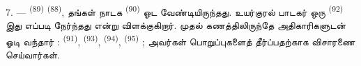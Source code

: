 7. ---  \textsuperscript{(89)}
 \textsuperscript{(88)}, 
 தங்கள் நாடக 
\textsuperscript{(90)} ஓட வேண்டியிருந்தது. உயர்குரல் பாடகர் ஒரு
 \textsuperscript{(92)} இது எப்படி நேர்ந்தது
என்று விளக்குகிறார்.  முதல் கணத்திலிருந்தே
அதிகாரிகளுடன் ஓடி வந்தார் :  \textsuperscript{(91)},
 \textsuperscript{(93)}, 
\textsuperscript{(94)}, 
\textsuperscript{(95)} ; அவர்கள் பொறுப்புகளைத் தீர்ப்பதற்காக விசாரணை
செய்வார்கள்.

\VUsaut{6.0mm}
\VUfilet{22mm}
